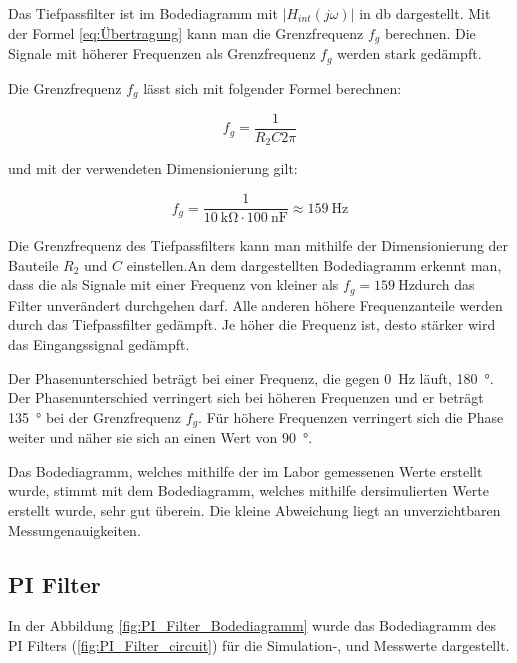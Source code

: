 Das Tiefpassfilter ist im Bodediagramm mit \( \left| H_{int}(j\omega) \right| \) in \si{\decibel} dargestellt. Mit der Formel \ref{eq:Übertragung} kann man die Grenzfrequenz $f_g$ berechnen. Die Signale mit höherer Frequenzen als  Grenzfrequenz $f_g$ werden stark gedämpft.

Die Grenzfrequenz $f_g$ lässt sich mit folgender Formel berechnen:

\begin{equation*}
 f_g=\frac{1}{R_2 C 2\pi} 
\end{equation*}

und mit der verwendeten Dimensionierung gilt:

\begin{equation*}
 f_g=\frac{1}{\SI{10}{\kilo\ohm}\cdot\SI{100}{\nano\farad}}\approx \SI{159}{\hertz}
\end{equation*}

Die Grenzfrequenz des Tiefpassfilters kann man mithilfe der Dimensionierung der Bauteile $R_2$ und $C$ einstellen.An dem dargestellten Bodediagramm erkennt man, dass die als Signale mit einer Frequenz von kleiner als $f_g= \SI{159}{\hertz}$durch das Filter  unverändert durchgehen darf. Alle anderen höhere Frequenzanteile werden durch das Tiefpassfilter gedämpft. Je höher die Frequenz ist, desto stärker wird das Eingangssignal gedämpft. 

Der Phasenunterschied beträgt bei einer Frequenz, die gegen \SI{0}{\hertz} läuft, \SI{180}{\degree}. Der Phasenunterschied verringert sich bei höheren Frequenzen und er beträgt \SI{135}{\degree} bei der Grenzfrequenz $f_g$. Für höhere Frequenzen verringert sich die Phase weiter und näher sie sich an einen Wert von \SI{90}{\degree}.

Das Bodediagramm, welches mithilfe der im Labor gemessenen Werte erstellt wurde, stimmt mit dem Bodediagramm,  welches mithilfe dersimulierten Werte erstellt wurde, sehr gut überein. Die kleine Abweichung liegt an unverzichtbaren Messungenauigkeiten.


%
\subsection{PI Filter}
In der Abbildung \ref{fig:PI_Filter_Bodediagramm} wurde das Bodediagramm des PI Filters (\ref{fig:PI_Filter_circuit}) für die Simulation-, und Messwerte dargestellt.

